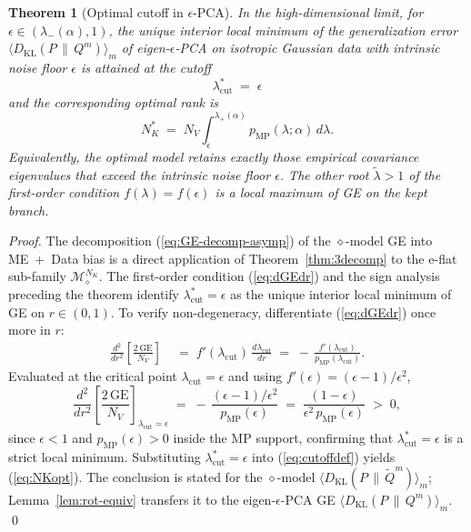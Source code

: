 \documentclass[11pt,a4paper]{article}
\newtheorem{theorem}{Theorem}
\theoremstyle{definition}
\theoremstyle{remark}
\newcommand{\KL}{D_{\mathrm{KL}}}
\newcommand{\PV}{P}
\newcommand{\QVm}{Q^{m}}
\newcommand{\NK}{N_K}
\newcommand{\NV}{N_V}
\newcommand{\Mfam}{\mathcal{M}}
\begin{document}
\begin{theorem}[Optimal cutoff in $\epsilon$-PCA]
\label{thm:optimal-cutoff}
In the high-dimensional limit, for
$\epsilon \in (\lambda_{-}(\alpha), 1)$, the unique interior
local minimum of the generalization error
$\langle\KL(\PV \,\|\, \QVm)\rangle_{m}$ of
eigen-$\epsilon$-PCA on isotropic Gaussian data with intrinsic
noise floor $\epsilon$ is attained at the cutoff
\begin{equation}
  \boxed{\;\lambda_{\mathrm{cut}}^{*} \;=\; \epsilon\;}
  \label{eq:optcut}
\end{equation}
and the corresponding optimal rank is
\begin{equation}
  \NK^{*} \;=\; \NV \int_{\epsilon}^{\lambda_{+}(\alpha)}
                  p_{\mathrm{MP}}(\lambda;\alpha)\,d\lambda .
  \label{eq:NKopt}
\end{equation}
Equivalently, the optimal model retains exactly those empirical
covariance eigenvalues that exceed the intrinsic noise floor
$\epsilon$. The other root $\widetilde{\lambda} > 1$ of the
first-order condition $f(\lambda) = f(\epsilon)$ is a local
\emph{maximum} of GE on the kept branch.
\end{theorem}

\begin{proof}
The decomposition (\ref{eq:GE-decomp-asymp}) of the
$\diamond$-model GE into ME~+~Data bias is a direct application
of Theorem~\ref{thm:3decomp} to the e-flat sub-family
$\Mfam_{\diamond}^{\NK}$. The first-order condition
(\ref{eq:dGEdr}) and the sign analysis preceding the theorem
identify $\lambda_{\mathrm{cut}}^{*} = \epsilon$ as the unique
interior local minimum of GE on $r \in (0,1)$. To verify
non-degeneracy, differentiate (\ref{eq:dGEdr}) once more in $r$:
\begin{align*}
  \frac{d^{2}}{dr^{2}}\!\left[\frac{2\,\mathrm{GE}}{\NV}\right]
  &\;=\; f'(\lambda_{\mathrm{cut}})\,
         \frac{d\lambda_{\mathrm{cut}}}{dr}
  \;=\; -\,\frac{f'(\lambda_{\mathrm{cut}})}{p_{\mathrm{MP}}(\lambda_{\mathrm{cut}})}.
\end{align*}
Evaluated at the critical point $\lambda_{\mathrm{cut}} = \epsilon$
and using $f'(\epsilon) = (\epsilon - 1)/\epsilon^{2}$,
\begin{equation*}
  \frac{d^{2}}{dr^{2}}\!\left[\frac{2\,\mathrm{GE}}{\NV}\right]_{\lambda_{\mathrm{cut}}=\epsilon}
  \;=\;
  -\,\frac{(\epsilon - 1)/\epsilon^{2}}{p_{\mathrm{MP}}(\epsilon)}
  \;=\;
  \frac{(1 - \epsilon)}{\epsilon^{2}\,p_{\mathrm{MP}}(\epsilon)}
  \;>\; 0,
\end{equation*}
since $\epsilon < 1$ and $p_{\mathrm{MP}}(\epsilon) > 0$ inside
the MP support, confirming that $\lambda_{\mathrm{cut}}^{*} =
\epsilon$ is a strict local minimum. Substituting
$\lambda_{\mathrm{cut}}^{*} = \epsilon$ into (\ref{eq:cutoffdef})
yields (\ref{eq:NKopt}). The conclusion is stated for the
$\diamond$-model
$\langle\KL(\PV \,\|\, \widetilde{Q}^{m})\rangle_{m}$;
Lemma~\ref{lem:rot-equiv} transfers it to the eigen-$\epsilon$-PCA
GE $\langle\KL(\PV \,\|\, \QVm)\rangle_{m}$.
\qed
\end{proof}
\end{document}
